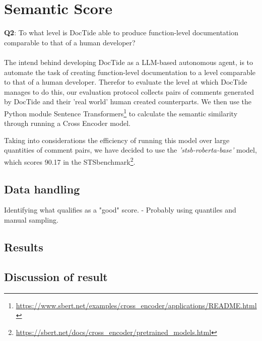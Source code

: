 \section{Semantic Score}
\textbf{Q2}: To what level is DocTide able to produce function-level documentation comparable to that of a human developer?
\\ \\
The intend behind developing DocTide as a LLM-based autonomous agent, is to automate the task of creating function-level documentation to a level comparable to that of a human developer. Therefor to evaluate the level at which DocTide manages to do this, our evaluation protocol collects pairs of comments generated by DocTide and their 'real world' human created counterparts. We then use the Python module Sentence Transformers\footnote{\url{https://www.sbert.net/examples/cross_encoder/applications/README.html}} to calculate the semantic similarity through running a Cross Encoder model.

Taking into considerations the efficiency of running this model over large quantities of comment pairs, we have decided to use the \textit{'stsb-roberta-base'} model, which scores 90.17 in the STSbenchmark\footnote{\url{https://sbert.net/docs/cross_encoder/pretrained_models.html}}.

\subsection{Data handling}
Identifying what qualifies as a "good" score. - Probably using quantiles and manual sampling.

\subsection{Results}
\subsection{Discussion of result}


